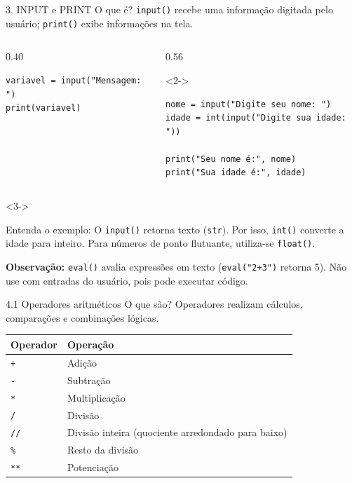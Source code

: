 \begin{frame}[fragile,t]{3. INPUT e PRINT}
O que é? \texttt{input()} recebe uma informação digitada pelo usuário; \texttt{print()} exibe informações na tela.\par
\begin{columns}[T,onlytextwidth]
\begin{column}{0.40\textwidth}
\begin{lstlisting}
variavel = input("Mensagem: ")
print(variavel)
\end{lstlisting}
\end{column}
\begin{column}{0.56\textwidth}
\begin{visibleenv}<2->
\begin{lstlisting}
nome = input("Digite seu nome: ")
idade = int(input("Digite sua idade: "))

print("Seu nome é:", nome)
print("Sua idade é:", idade)
\end{lstlisting}
\end{visibleenv}
\end{column}
\end{columns}
\begin{visibleenv}<3->
\begin{EMASCnote}
Entenda o exemplo: O \texttt{input()} retorna texto (\texttt{str}). Por isso, \texttt{int()} converte a idade para inteiro. Para números de ponto flutuante, utiliza-se \texttt{float()}.
\par\smallskip
\textbf{Observação:} \texttt{eval()} avalia expressões em texto (\mbox{\texttt{eval("2+3")}} retorna 5). Não use com entradas do usuário, pois pode executar código.
\end{EMASCnote}
\end{visibleenv}
\end{frame}

\begin{frame}[t]{4.1 Operadores aritméticos}
O que são? Operadores realizam cálculos, comparações e combinações lógicas.\par
\begin{tabularx}{\linewidth}{@{}lX@{}}
\toprule
\textbf{Operador} & \textbf{Operação} \\
\midrule
\texttt{+} & Adição \\
\texttt{-} & Subtração \\
\texttt{*} & Multiplicação \\
\texttt{/} & Divisão \\
\texttt{//} & Divisão inteira (quociente arredondado para baixo) \\
\texttt{\%} & Resto da divisão \\
\texttt{**} & Potenciação \\
\bottomrule
\end{tabularx}
\end{frame}

